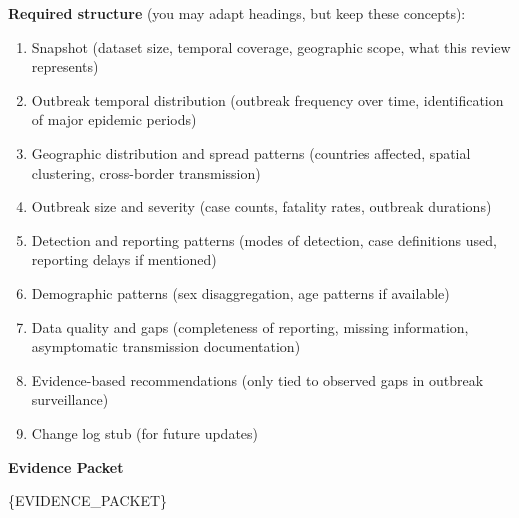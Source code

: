 \begin{tcolorbox}
\begin{tcolorbox}[
    enhanced,
    colback=gray!5,
    colframe=gray!20,
    boxrule=0pt,
    leftrule=3pt,
    arc=0pt,
    left=6pt, right=6pt, top=4pt, bottom=4pt
]
{\textbf{Required structure} (you may adapt headings, but keep these concepts):
\begin{enumerate}[label=\arabic*), leftmargin=*, itemsep=-3pt]
    \item Snapshot (dataset size, temporal coverage, geographic scope, what this review represents)
    \item Outbreak temporal distribution (outbreak frequency over time, identification of major epidemic periods)
    \item Geographic distribution and spread patterns (countries affected, spatial clustering, cross-border transmission)
    \item Outbreak size and severity (case counts, fatality rates, outbreak durations)
    \item Detection and reporting patterns (modes of detection, case definitions used, reporting delays if mentioned)
    \item Demographic patterns (sex disaggregation, age patterns if available)
    \item Data quality and gaps (completeness of reporting, missing information, asymptomatic transmission documentation)
    \item Evidence-based recommendations (only tied to observed gaps in outbreak surveillance)
    \item Change log stub (for future updates)
\end{enumerate}
}
\end{tcolorbox}

\begin{tcolorbox}[
    enhanced,
    colback=gray!5,
    colframe=gray!20,
    boxrule=0pt,
    leftrule=3pt,
    arc=0pt,
    left=6pt, right=6pt, top=4pt, bottom=4pt
]
{\small\textbf{\textcolor{gray!70!black}{Evidence Packet}}}

\vspace{2pt}
{\small\ttfamily
\{EVIDENCE\_PACKET\}
}
\end{tcolorbox}

\end{tcolorbox}

